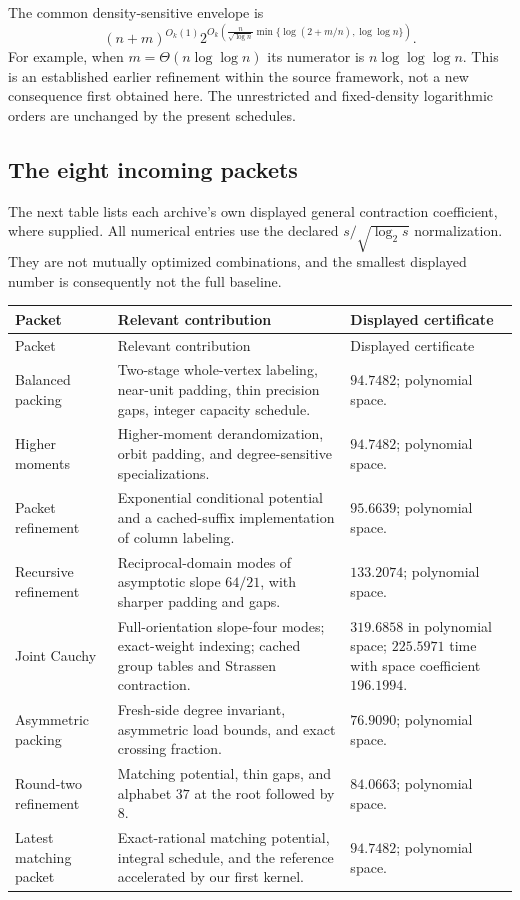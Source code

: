 The common density-sensitive envelope is
\[
 (n+m)^{O_k(1)}
 2^{O_k\!\left(\frac{n}{\sqrt{\log n}}
       \min\{\log(2+m/n),\log\log n\}\right)}.
\]
For example, when $m=\Theta(n\log\log n)$ its numerator is
$n\log\log\log n$. This is an established earlier refinement within the
source framework, not a new consequence first obtained here. The unrestricted
and fixed-density logarithmic orders are unchanged by the present schedules.

\subsection{The eight incoming packets}

The next table lists each archive's own displayed general contraction
coefficient, where supplied. All numerical entries use the declared
$s/\sqrt{\log_2s}$ normalization. They are not mutually optimized combinations,
and the smallest displayed number is consequently not the full baseline.

\begingroup
\small
\setlength{\tabcolsep}{4pt}
\begin{longtable}{@{}>{\raggedright\arraybackslash}p{}>{\raggedright\arraybackslash}p{}>{\raggedright\arraybackslash}p{}@{}}
\toprule
Packet & Relevant contribution & Displayed certificate\\
\midrule
\endfirsthead
\toprule
Packet & Relevant contribution & Displayed certificate\\
\midrule
\endhead
Balanced packing\cite{balanced}
& Two-stage whole-vertex labeling, near-unit padding, thin precision gaps, integer capacity schedule.
& $94.7482$; polynomial space.\\[4pt]
Higher moments\cite{highmoment}
& Higher-moment derandomization, orbit padding, and degree-sensitive specializations.
& $94.7482$; polynomial space.\\[4pt]
Packet refinement\cite{packet}
& Exponential conditional potential and a cached-suffix implementation of column labeling.
& $95.6639$; polynomial space.\\[4pt]
Recursive refinement\cite{recursive}
& Reciprocal-domain modes of asymptotic slope $64/21$, with sharper padding and gaps.
& $133.2074$; polynomial space.\\[4pt]
Joint Cauchy\cite{joint}
& Full-orientation slope-four modes; exact-weight indexing; cached group tables and Strassen contraction.
& $319.6858$ in polynomial space; $225.5971$ time with space coefficient $196.1994$.\\[4pt]
Asymmetric packing\cite{asymmetric}
& Fresh-side degree invariant, asymmetric load bounds, and exact crossing fraction.
& $76.9090$; polynomial space.\\[4pt]
Round-two refinement\cite{roundtwo}
& Matching potential, thin gaps, and alphabet $37$ at the root followed by $8$.
& $84.0663$; polynomial space.\\[4pt]
Latest matching packet\cite{matching}
& Exact-rational matching potential, integral schedule, and the reference accelerated by our first kernel.
& $94.7482$; polynomial space.\\
\bottomrule
\end{longtable}
\endgroup


